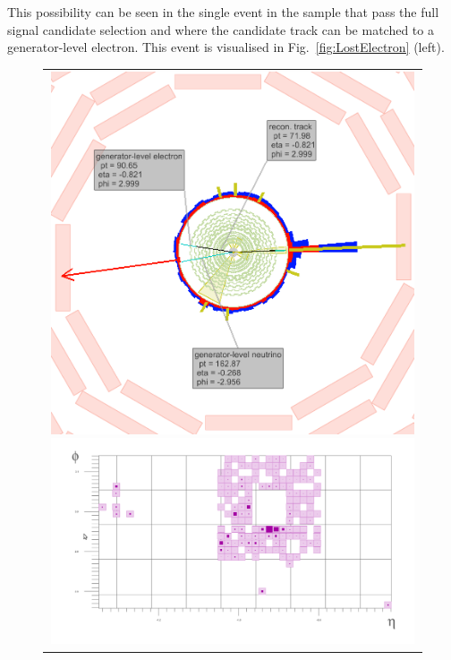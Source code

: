 This possibility can be seen in the single event in the \WJets sample that pass the full signal candidate selection and where the candidate track can be matched to a generator-level electron. 
This event is visualised in Fig.~\ref{fig:LostElectron} (left). 
\begin{figure}[!t]
  \centering 
  \begin{tabular}{c}
  \begin{minipage}[c]{0.49\textwidth}
  \centering
  \includegraphics[width=0.99\textwidth]{figures/analysis/Electron_lumi_279317_event_111637553.png}
  \end{minipage} 
  \begin{minipage}[c]{0.49\textwidth}
  \centering
  \includegraphics[width=0.99\textwidth]{figures/analysis_2/Background/TowerDetailViewZoom.png}

\end{minipage}
\end{tabular}
\end{figure}
